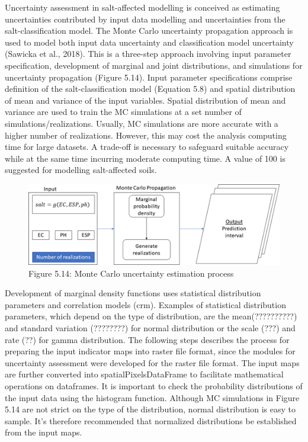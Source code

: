 \documentclass[
  10pt,
  b5paper,
]{book}
\begin{document}
Uncertainty assessment in salt-affected modelling is conceived as estimating uncertainties contributed by input data modelling and uncertainties from the salt-classification model. The Monte Carlo uncertainty propagation approach is used to model both input data uncertainty and classification model uncertainty (Sawicka et al., 2018). This is a three-step approach involving input parameter specification, development of marginal and joint distributions, and simulations for uncertainty propagation (Figure 5.14). Input parameter specifications comprise definition of the salt-classification model (Equation 5.8) and spatial distribution of mean and variance of the input variables. Spatial distribution of mean and variance are used to train the MC simulations at a set number of simulations/realizations. Usually, MC simulations are more accurate with a higher number of realizations. However, this may cost the analysis computing time for large datasets. A trade-off is necessary to safeguard suitable accuracy while at the same time incurring moderate computing time. A value of 100 is suggested for modelling salt-affected soils.

\begin{figure}
\centering
\includegraphics{figures/images/Figure5.14.png}
\caption{Figure 5.14: Monte Carlo uncertainty estimation process}
\end{figure}

Development of marginal density functions uses statistical distribution parameters and correlation models (crm). Examples of statistical distribution parameters, which depend on the type of distribution, are the mean(??????????) and standard variation (????????) for normal distribution or the scale (???) and rate (??) for gamma distribution.
The following steps describes the process for preparing the input indicator maps into raster file format, since the modules for uncertainty assessment were developed for the raster file format. The input maps are further converted into spatialPixelsDataFrame to facilitate mathematical operations on dataframes. It is important to check the probability distributions of the input data using the histogram function. Although MC simulations in Figure 5.14 are not strict on the type of the distribution, normal distribution is easy to sample. It's therefore recommended that normalized distributions be established from the input maps.
\end{document}
